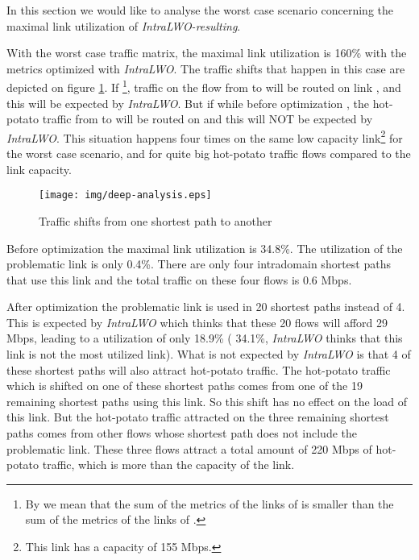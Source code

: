 \documentclass{acm_proc_article-sp}
\begin{document}
In this section we would like to analyse the worst case scenario
concerning the maximal link utilization of \textit{IntraLWO-resulting}. 

With the worst case traffic matrix, the maximal link utilization is
160\% with the metrics optimized with \textit{IntraLWO}.
The traffic shifts that happen in this case are depicted on figure
\ref{fig:deep-analysis}. If \footnote{By  we mean
  that the sum of the metrics of the links of  is
  smaller than the sum of the metrics of the links of
  .}, traffic on the flow from  to  will be
routed on link , and this will be expected by \textit{IntraLWO}. But if
 while before optimization
, the hot-potato traffic from  to
 will be routed on  and this will NOT be expected by
\textit{IntraLWO}. This situation happens four times on the same low capacity
link\footnote{This link has a capacity of 155 Mbps.} for the
worst case scenario, and for quite big hot-potato traffic
flows compared to the link capacity. 

\begin{figure}[htbp]
  \centering
  \texttt{[image: img/deep-analysis.eps]}
  \caption{Traffic shifts from one shortest path to another}
  \label{fig:deep-analysis}
\end{figure}

Before optimization the maximal link utilization is 34.8\%. The
utilization of the problematic link is only 0.4\%. There are only four
intradomain shortest paths that use this link and the total traffic
on these four flows is 0.6 Mbps.

After optimization the problematic link is used in 20
shortest paths instead of 4. This is expected by \textit{IntraLWO} which thinks
that these 20 flows will afford 29 Mbps, leading to a utilization
of only 18.9\% ( 34.1\%, \textit{IntraLWO} thinks that this link is
not the most utilized link). What is not expected by \textit{IntraLWO} is that 4 of these
shortest paths will also attract hot-potato traffic. The hot-potato
traffic which is shifted on one of these shortest paths comes from one
of the 19 remaining shortest paths using this link. So this shift has
no effect on the load of this link. But the hot-potato traffic
attracted on the three remaining shortest paths comes from other flows
whose shortest path does not include the problematic link. These
three flows attract a total amount of 220 Mbps of hot-potato
traffic, which is more than the capacity of the link.
\end{document}
